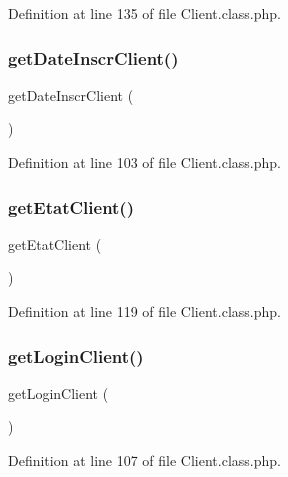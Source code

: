 Definition at line 135 of file Client.\+class.\+php.

\mbox{\label{class_client_afd5f076c85b2f8f69204215429a51aab}} 
\subsubsection{\texorpdfstring{get\+Date\+Inscr\+Client()}{getDateInscrClient()}}
{\footnotesize\ttfamily get\+Date\+Inscr\+Client (\begin{DoxyParamCaption}{ }\end{DoxyParamCaption})}



Definition at line 103 of file Client.\+class.\+php.

\mbox{\label{class_client_a7658c4be9316977f4d23695e735b219a}} 
\subsubsection{\texorpdfstring{get\+Etat\+Client()}{getEtatClient()}}
{\footnotesize\ttfamily get\+Etat\+Client (\begin{DoxyParamCaption}{ }\end{DoxyParamCaption})}



Definition at line 119 of file Client.\+class.\+php.

\mbox{\label{class_client_ab90a68e85f0d082e565e499d94e74f7e}} 
\subsubsection{\texorpdfstring{get\+Login\+Client()}{getLoginClient()}}
{\footnotesize\ttfamily get\+Login\+Client (\begin{DoxyParamCaption}{ }\end{DoxyParamCaption})}



Definition at line 107 of file Client.\+class.\+php.

